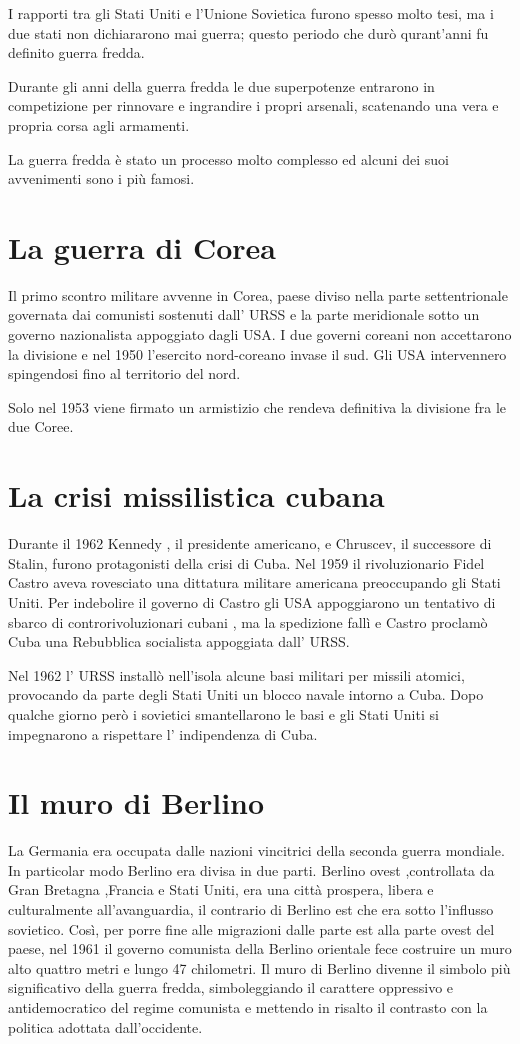 I rapporti tra gli Stati Uniti e l'Unione Sovietica furono spesso molto tesi, ma i due stati non dichiararono mai guerra; questo periodo che durò qurant'anni fu definito guerra fredda.

Durante gli anni della guerra fredda le due superpotenze entrarono in competizione per rinnovare e ingrandire i propri arsenali, scatenando una vera e propria corsa agli armamenti.

\noindent
La guerra fredda è stato un processo molto complesso ed alcuni dei suoi avvenimenti sono i più famosi.

\section{La guerra di Corea}
Il primo scontro militare avvenne in Corea, paese diviso nella parte settentrionale governata dai comunisti sostenuti dall’ URSS e la parte meridionale sotto un governo nazionalista appoggiato dagli USA. I due governi coreani non accettarono la divisione e nel 1950 l’esercito nord-coreano invase il sud. Gli USA intervennero spingendosi fino al territorio del nord.

\noindent
Solo nel 1953 viene firmato un armistizio che rendeva definitiva la divisione fra le due Coree.

\section{La crisi missilistica cubana}
Durante il 1962 Kennedy , il presidente americano, e Chruscev, il successore di Stalin, furono protagonisti della crisi di Cuba. Nel 1959 il rivoluzionario Fidel Castro aveva rovesciato una dittatura militare americana preoccupando gli Stati Uniti. Per indebolire il governo di Castro gli USA appoggiarono un tentativo di sbarco di controrivoluzionari cubani , ma la spedizione fallì e Castro proclamò Cuba una Rebubblica socialista appoggiata dall’ URSS.

Nel 1962 l’ URSS installò nell’isola alcune basi militari per missili atomici, provocando da parte degli Stati Uniti un blocco navale intorno a Cuba. Dopo qualche giorno però i sovietici smantellarono le basi e gli Stati Uniti si impegnarono a rispettare l’ indipendenza di Cuba.

\section{Il muro di Berlino}
La Germania era occupata dalle nazioni vincitrici della seconda guerra mondiale. In particolar modo Berlino era divisa in due parti. Berlino ovest ,controllata da Gran Bretagna ,Francia e Stati Uniti, era una città prospera, libera e culturalmente all’avanguardia, il contrario di Berlino est che era sotto l’influsso sovietico. Così, per porre fine alle migrazioni dalle parte est alla parte ovest del paese, nel 1961 il governo comunista della Berlino orientale fece costruire un muro alto quattro metri e lungo 47 chilometri. Il muro di Berlino divenne il simbolo più significativo della guerra fredda, simboleggiando il carattere oppressivo e antidemocratico del regime comunista e mettendo in risalto il contrasto con la politica adottata dall'occidente.
